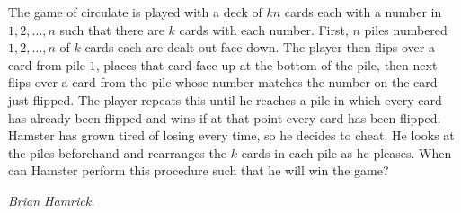 The game of circulate is played with a deck of $kn$ cards each with a number in $1,2,\ldots,n$ such that there are $k$ cards with each number. First, $n$ piles numbered $1,2,\ldots,n$ of $k$ cards each are dealt out face down. The player then flips over a card from pile $1$, places that card face up at the bottom of the pile, then next flips over a card from the pile whose number matches the number on the card just flipped. The player repeats this until he reaches a pile in which every card has already been flipped and wins if at that point every card has been flipped. Hamster has grown tired of losing every time, so he decides to cheat. He looks at the piles beforehand and rearranges the $k$ cards in each pile as he pleases. When can Hamster perform this procedure such that he will win the game?

\textit{Brian Hamrick.}